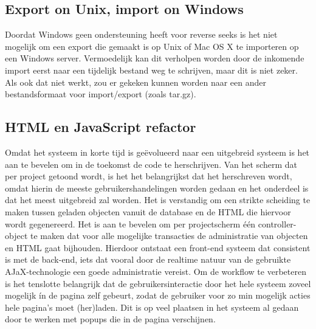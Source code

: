 \subsection{Export on Unix, import on Windows}
Doordat Windows geen ondersteuning heeft voor reverse seeks is het niet mogelijk om een export die gemaakt is op Unix of Mac OS X te importeren op een Windows server. Vermoedelijk kan dit verholpen worden door de inkomende import eerst naar een tijdelijk bestand weg te schrijven, maar dit is niet zeker. Als ook dat niet werkt, zou er gekeken kunnen worden naar een ander bestandsformaat voor import/export (zoals tar.gz).

\subsection{HTML en JavaScript refactor}
Omdat het systeem in korte tijd is ge\"evolueerd naar een uitgebreid systeem is het aan te bevelen om in de toekomst de code te herschrijven.
Van het scherm dat per project getoond wordt, is het het belangrijkst dat het herschreven wordt, omdat hierin de meeste gebruikershandelingen worden gedaan en het onderdeel is dat het meest uitgebreid zal worden.
Het is verstandig om een strikte scheiding te maken tussen geladen objecten vanuit de database en de HTML die hiervoor wordt gegenereerd.
Het is aan te bevelen om per projectscherm \'{e}\'{e}n controller-object te maken dat voor alle mogelijke transacties de administratie van objecten en HTML gaat bijhouden.
Hierdoor ontstaat een front-end systeem dat consistent is met de back-end, iets dat vooral door de realtime natuur van de gebruikte AJaX-technologie een goede administratie vereist.
Om de workflow te verbeteren is het tenslotte belangrijk dat de gebruikersinteractie door het hele systeem zoveel mogelijk \'in de pagina zelf gebeurt, zodat de gebruiker voor zo min mogelijk acties hele pagina's moet (her)laden.
Dit is op veel plaatsen in het systeem al gedaan door te werken met popups die in de pagina verschijnen.
